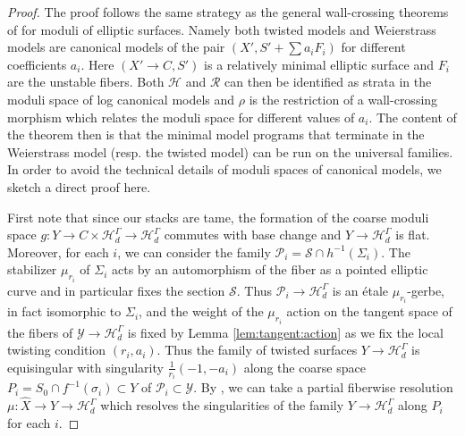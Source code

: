 \documentclass[a4paper,12pt]{amsart}
\theoremstyle{definition}
\newcommand{\cY}{\mathcal{Y}}
\newcommand{\cH}{\mathcal{H}}
\newcommand{\cR}{\mathcal{R}}
\newcommand{\cS}{\mathcal{S}}
\newcommand{\cP}{\mathcal{P}}
\begin{document}
	\begin{proof}
		The proof follows the same strategy as the general wall-crossing theorems of \cite{AB3, Inchiostro, ABIP} for moduli of elliptic surfaces. Namely both twisted models and Weierstrass models are canonical models of the pair $(X', S' + \sum a_i F_i)$ for different coefficients $a_i$. Here $(X' \to C, S')$ is a relatively minimal elliptic surface and $F_i$ are the unstable fibers. Both $\cH$ and $\cR$ can then be identified as strata in the moduli space of log canonical models and $\rho$ is the restriction of a wall-crossing morphism which relates the moduli space for different values of $a_i$. The content of the theorem then is that the minimal model programs that terminate in the Weierstrass model (resp. the twisted model) can be run on the universal families. In order to avoid the technical details of moduli spaces of canonical models, we sketch a direct proof here. 
		
		First note that since our stacks are tame, the formation of the coarse moduli space $g : Y \to C \times \cH^\Gamma_d \to \cH^\Gamma_d$ commutes with base change and $Y \to \cH^\Gamma_d$ is flat.  Moreover, for each $i$, we can consider the family $\cP_i = \cS \cap h^{-1}(\Sigma_i)$. The stabilizer $\mu_{r_i}$ of $\Sigma_i$ acts by an automorphism of the fiber as a pointed elliptic curve and in particular fixes the section $\cS$. Thus $\cP_i \to \cH^\Gamma_d$ is an \'etale $\mu_{r_i}$-gerbe, in fact isomorphic to $\Sigma_i$, and the weight of the $\mu_{r_i}$ action on the tangent space of the fibers of $\cY \to \cH^\Gamma_d$ is fixed by Lemma \ref{lem:tangent:action} as we fix the local twisting condition $(r_i, a_i)$. Thus the family of twisted surfaces $Y \to \cH^\Gamma_d$ is equisingular with singularity $\frac{1}{r_i}(-1,-a_i)$ along the coarse space $P_i = S_0 \cap f^{-1}(\sigma_i) \subset Y$ of $\cP_i \subset \cY$. By \cite[Prop. 5.9]{Inchiostro}, we can take a partial fiberwise resolution $\mu : \hat{X} \to Y \to \cH^\Gamma_d$ which resolves the singularities of the family $Y \to \cH^\Gamma_d$ along $P_i$ for each $i$. 
		

\end{proof}
\end{document}
